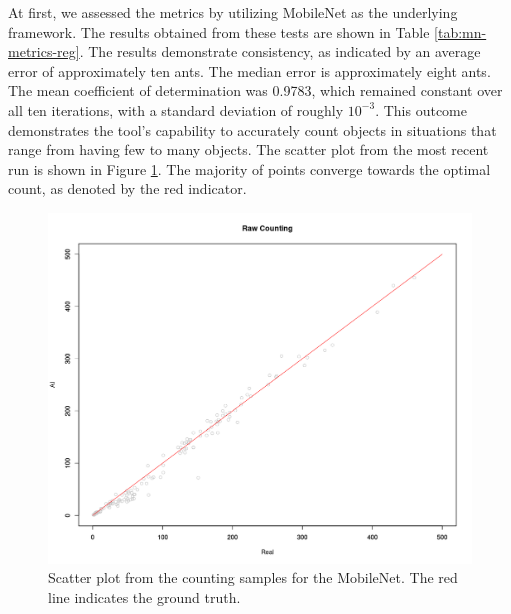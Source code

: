 At first, we assessed the metrics by utilizing MobileNet as the underlying framework. The results obtained from these tests are shown in Table \ref{tab:mn-metrics-reg}. The results demonstrate consistency, as indicated by an average error of approximately ten ants. The median error is approximately eight ants. The mean coefficient of determination was 0.9783, which remained constant over all ten iterations, with a standard deviation of roughly $10^{-3}$. This outcome demonstrates the tool's capability to accurately count objects in situations that range from having few to many objects. The scatter plot from the most recent run is shown in Figure \ref{fig:mn-plot}. The majority of points converge towards the optimal count, as denoted by the red indicator.


\begin{table}[h!]
\centering
\caption{Counting metrics for the MobileNet}
\label{tab:mn-metrics-reg}
\end{table}

\begin{figure}[h!]
    \centering
    \includegraphics[width = .7\linewidth]{Figures/MNV1.png}
    \caption{Scatter plot from the counting samples for the MobileNet. The red line indicates the ground truth.}
    \label{fig:mn-plot}
\end{figure}


